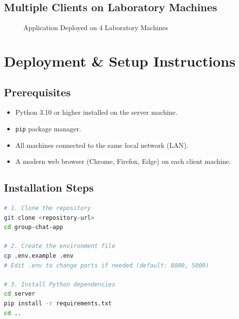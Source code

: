 \documentclass[12pt, a4paper]{article}
\begin{document}
\subsection{Multiple Clients on Laboratory Machines}

\begin{figure}[H]
    \centering
    \caption{Application Deployed on 4 Laboratory Machines}
    \label{fig:labdeploy}
\end{figure}


\section{Deployment \& Setup Instructions}

\subsection{Prerequisites}
\begin{itemize}[leftmargin=*]
    \item Python 3.10 or higher installed on the server machine.
    \item \texttt{pip} package manager.
    \item All machines connected to the same local network (LAN).
    \item A modern web browser (Chrome, Firefox, Edge) on each client machine.
\end{itemize}

\subsection{Installation Steps}

\begin{lstlisting}[language=bash, caption={Installation Commands}, label={lst:install}]
# 1. Clone the repository
git clone <repository-url>
cd group-chat-app

# 2. Create the environment file
cp .env.example .env
# Edit .env to change ports if needed (default: 8000, 5000)

# 3. Install Python dependencies
cd server
pip install -r requirements.txt
cd ..
\end{lstlisting}
\end{document}
